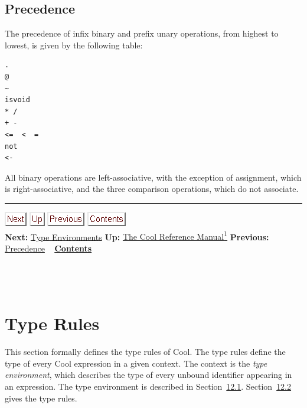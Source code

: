 \documentclass[]{article}
\begin{document}
\subsection{Precedence}

The precedence of infix binary and prefix unary operations, from highest
to lowest, is given by the following table:

\begin{verbatim}
.
@
~
isvoid
* /
+ -
<=  <  =
not
<-
\end{verbatim}

All binary operations are left-associative, with the exception of
assignment, which is right-associative, and the three comparison
operations, which do not associate.

\begin{center}\rule{3in}{0.4pt}\end{center}

\href{node42.html}{\includegraphics{next.png}}
\href{cool-manual.html}{\includegraphics{up.png}}
\href{node40.html}{\includegraphics{prev.png}}
\href{node1.html}{\includegraphics{contents.png}} \\ \textbf{Next:}
\href{node42.html}{Type Environments} \textbf{Up:}
\href{cool-manual.html}{The Cool Reference Manual\textsuperscript{1}}
\textbf{Previous:} \href{node40.html}{Precedence} ~
\textbf{\href{node1.html}{Contents}} \\ \\

\section{\\ Type Rules}

This section formally defines the type rules of Cool. The type rules
define the type of every Cool expression in a given context. The context
is the \emph{type environment}, which describes the type of every
unbound identifier appearing in an expression. The type environment is
described in Section~\href{node42.html\#sec-typenv}{12.1}.
Section~\href{node43.html\#sec-typr}{12.2} gives the type rules.
\end{document}
